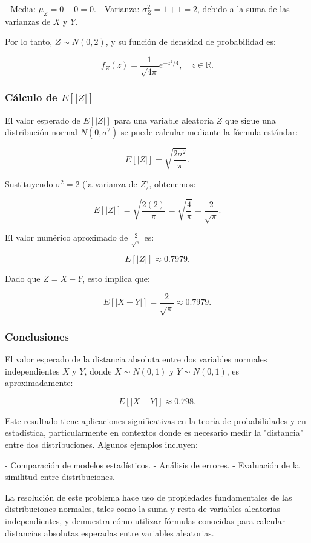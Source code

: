 \documentclass[12pt]{article}
\begin{document}
- Media: $\mu_Z = 0 - 0 = 0$.
- Varianza: $\sigma_Z^2 = 1 + 1 = 2$, debido a la suma de las varianzas de $X$ y $Y$.

Por lo tanto, $Z \sim N(0, 2)$, y su función de densidad de probabilidad es:

\[
f_Z(z) = \frac{1}{\sqrt{4\pi}} e^{-z^2/4}, \quad z \in \mathbb{R}.
\]

\subsubsection{Cálculo de $E[|Z|]$}
El valor esperado de $E[|Z|]$ para una variable aleatoria $Z$ que sigue una distribución normal $N(0, \sigma^2)$ se puede calcular mediante la fórmula estándar:

\[
E[|Z|] = \sqrt{\frac{2\sigma^2}{\pi}}.
\]

Sustituyendo $\sigma^2 = 2$ (la varianza de $Z$), obtenemos:

\[
E[|Z|] = \sqrt{\frac{2(2)}{\pi}} = \sqrt{\frac{4}{\pi}} = \frac{2}{\sqrt{\pi}}.
\]

El valor numérico aproximado de $\frac{2}{\sqrt{\pi}}$ es:

\[
E[|Z|] \approx 0.7979.
\]

Dado que $Z = X - Y$, esto implica que:

\[
E[|X - Y|] = \frac{2}{\sqrt{\pi}} \approx 0.7979.
\]

\subsubsection{Conclusiones}
El valor esperado de la distancia absoluta entre dos variables normales independientes $X$ y $Y$, donde $X \sim N(0, 1)$ y $Y \sim N(0, 1)$, es aproximadamente:

\[
E[|X - Y|] \approx 0.798.
\]

Este resultado tiene aplicaciones significativas en la teoría de probabilidades y en estadística, particularmente en contextos donde es necesario medir la "distancia" entre dos distribuciones. Algunos ejemplos incluyen:

- Comparación de modelos estadísticos.
- Análisis de errores.
- Evaluación de la similitud entre distribuciones.

La resolución de este problema hace uso de propiedades fundamentales de las distribuciones normales, tales como la suma y resta de variables aleatorias independientes, y demuestra cómo utilizar fórmulas conocidas para calcular distancias absolutas esperadas entre variables aleatorias.
\end{document}
